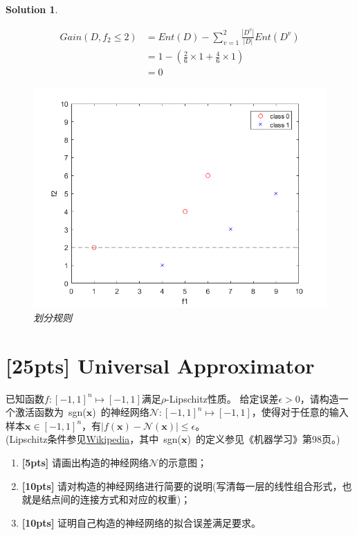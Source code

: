 \documentclass[a4paper,UTF8]{article}
\numberwithin{equation}{section}
\newtheorem*{solution}{Solution}
\begin{document}
\begin{solution}
\begin{enumerate}
\begin{equation}
\begin{aligned}
 Gain(D, f_2\leq 2) &= Ent(D) - \sum_{v=1}^{2}\frac{|D^v|}{|D|}Ent(D^v)\\
 &= 1 - (\frac{2}{6}\times 1 + \frac{4}{6}\times 1)\\
 &= 0
 \end{aligned}
 \end{equation}
 \begin{figure}[!h]
 	\centering   
 	\includegraphics[scale=0.4]{coordinate2.png}  
 	\caption{划分规则} 
 	\label{coordinate2}
 \end{figure}
 \end{enumerate}
 \end{solution}
\newpage

\section{[25pts] Universal Approximator}
已知函数$f:[-1, 1]^n \mapsto [-1, 1]$满足$\rho$-Lipschitz性质。 给定误差$\epsilon > 0$，请构造一个激活函数为\mbox{ sgn($\mathbf{x}$) }的神经网络$ \mathcal{N}:[-1,1]^n \mapsto [-1,1] $，使得对于任意的输入样本$ \mathbf{x} \in [-1,1]^n $，有$|f(\mathbf{x}) - \mathcal{N}(\mathbf{x})| \leq \epsilon$。\\
(Lipschitz条件参见\href{https://en.wikipedia.org/wiki/Lipschitz_continuity}{Wikipedia}，其中\mbox{ sgn($\mathbf{x}$) }的定义参见《机器学习》第98页。)

\begin{enumerate}[ {(}1{)}]
	\item \textbf{[5pts]} 请画出构造的神经网络$\mathcal{N}$的示意图；
	
	\item \textbf{[10pts]} 请对构造的神经网络进行简要的说明(写清每一层的线性组合形式，也就是结点间的连接方式和对应的权重)；
	
	\item \textbf{[10pts]} 证明自己构造的神经网络的拟合误差满足要求。
\end{enumerate}
\end{document}
